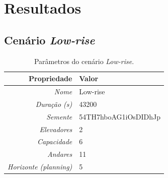 \chapter{\label{chap:results}Resultados}

\section{Cenário \textit{Low-rise}}

\lipsum[1]

\begin{table}[htb!]
\centering
\caption{Parâmetros do cenário \textit{Low-rise}.}
\label{tab:results:lowrise:params}
\begin{tabular}{|r|l|}
\hline
\textbf{Propriedade}          & \textbf{Valor}       \\ \hline
\textit{Nome}                 & Low-rise             \\ \hline
\textit{Duração (s)}          & 43200                \\ \hline
\textit{Semente}              & 54TH7hboAG1iOsDIDhJp \\ \hline
\textit{Elevadores}           & 2                    \\ \hline
\textit{Capacidade}           & 6                    \\ \hline
\textit{Andares}              & 11                   \\ \hline
\textit{Horizonte (planning)} & 5                    \\ \hline
\end{tabular}
\end{table}

